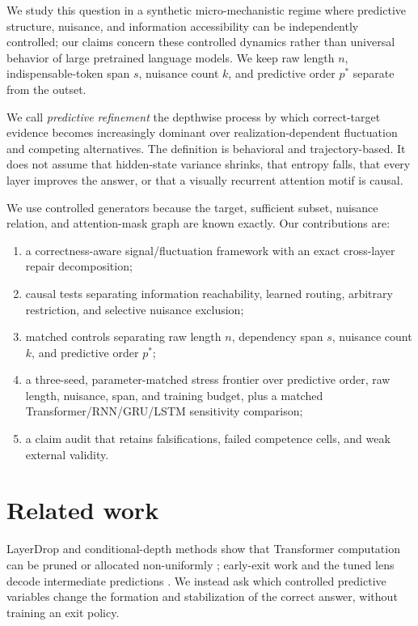 \documentclass[10pt]{article}
\begin{document}
We study this question in a synthetic micro-mechanistic regime where predictive structure, nuisance, and information accessibility can be independently controlled; our claims concern these controlled dynamics rather than universal behavior of large pretrained language models. We keep raw length $n$, indispensable-token span $s$, nuisance count $k$, and predictive order $p^*$ separate from the outset.

We call \emph{predictive refinement} the depthwise process by which correct-target evidence becomes increasingly dominant over realization-dependent fluctuation and competing alternatives. The definition is behavioral and trajectory-based. It does not assume that hidden-state variance shrinks, that entropy falls, that every layer improves the answer, or that a visually recurrent attention motif is causal.

We use controlled generators because the target, sufficient subset, nuisance relation, and attention-mask graph are known exactly. Our contributions are:
\begin{enumerate}
\item a correctness-aware signal/fluctuation framework with an exact cross-layer repair decomposition;
\item causal tests separating information reachability, learned routing, arbitrary restriction, and selective nuisance exclusion;
\item matched controls separating raw length $n$, dependency span $s$, nuisance count $k$, and predictive order $p^*$;
\item a three-seed, parameter-matched stress frontier over predictive order, raw length, nuisance, span, and training budget, plus a matched Transformer/RNN/GRU/LSTM sensitivity comparison;
\item a claim audit that retains falsifications, failed competence cells, and weak external validity.
\end{enumerate}

\section{Related work}
LayerDrop and conditional-depth methods show that Transformer computation can be pruned or allocated non-uniformly \cite{fan2019layerdrop,raposo2024mod,skip2023}; early-exit work and the tuned lens decode intermediate predictions \cite{belrose2023tuned}. We instead ask which controlled predictive variables change the formation and stabilization of the correct answer, without training an exit policy.
\end{document}
